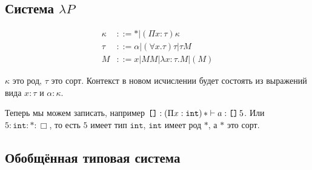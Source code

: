 \subsection*{\texorpdfstring{Система $\lambda P$}{Lambda P}}
\begin{definition}
\begin{bnf}
\begin{align*}
    \kappa &::= * | (\Pi x : \tau) \kappa \\
    \tau   &::= \alpha | (\forall x . \tau) \tau | \tau M \\
    M      &::= x | MM | \lambda x : \tau . M | (M)
\end{align*}
\end{bnf}%
$\kappa$ это род, $\tau$ это сорт.
Контекст в новом исчислении будет состоять из выражений вида $x : \tau$ и $\alpha : \kappa$.
\end{definition}

Теперь мы можем записать, например
$\texttt{[]} : (\Pi x : \texttt{int}) \mathinner{*} \vdash a : \mathinner{\texttt{[]}} 5$.
Или $5 : \texttt{int} : * : \Box$, то есть $5$ имеет тип $\texttt{int}$, $\texttt{int}$ имеет род $*$, а $*$ это сорт.

\subsection{\texorpdfstring{Обобщённая типовая система}{Generalized type system}}
